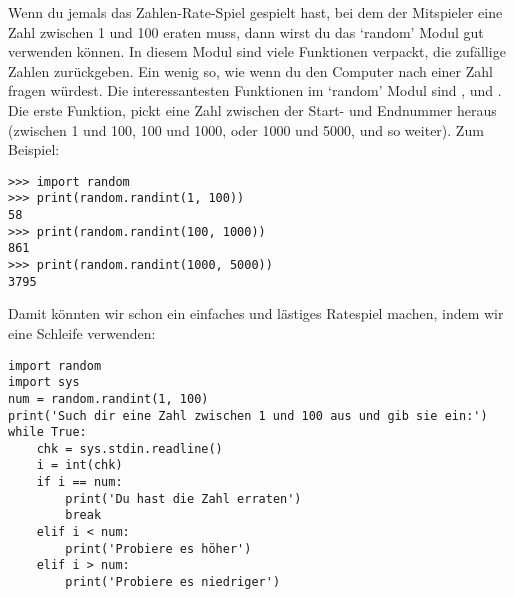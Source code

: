 Wenn du jemals das Zahlen-Rate-Spiel gespielt hast, bei dem der Mitspieler eine Zahl zwischen 1 und 100 eraten muss, dann wirst du das `random' Modul gut verwenden können. In diesem Modul sind viele Funktionen verpackt, die zufällige Zahlen zurückgeben. Ein wenig so, wie wenn du den Computer nach einer Zahl fragen würdest. Die interessantesten Funktionen im `random' Modul sind ,  und . Die erste Funktion,  pickt eine Zahl zwischen der Start- und Endnummer heraus (zwischen 1 und 100, 100 und 1000, oder 1000 und 5000, und so weiter). Zum Beispiel:

\begin{Verbatim}[frame=single]
>>> import random
>>> print(random.randint(1, 100))
58
>>> print(random.randint(100, 1000))
861
>>> print(random.randint(1000, 5000))
3795
\end{Verbatim}

Damit könnten wir schon ein einfaches und lästiges Ratespiel machen, indem wir eine Schleife verwenden:

\begin{Verbatim}[frame=single]
import random
import sys
num = random.randint(1, 100)
print('Such dir eine Zahl zwischen 1 und 100 aus und gib sie ein:')
while True:
    chk = sys.stdin.readline()
    i = int(chk)
    if i == num:
        print('Du hast die Zahl erraten')
        break
    elif i < num:
        print('Probiere es höher')
    elif i > num:
        print('Probiere es niedriger')
\end{Verbatim}

